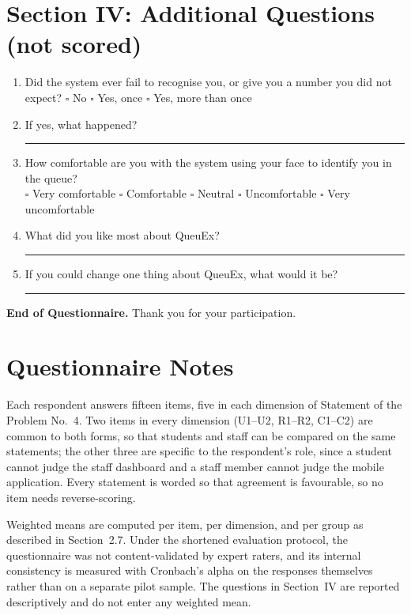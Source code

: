 \documentclass{research}
\newcommand{\sysname}{QueuEx}
\begin{document}
\section*{Section IV: Additional Questions (not scored)}

\begin{enumerate}
  \item Did the system ever fail to recognise you, or give you a number
        you did not expect?
        $\square$ No \quad $\square$ Yes, once \quad
        $\square$ Yes, more than once
  \item If yes, what happened?\\[0.3em]
        \rule{\linewidth}{0.4pt}
  \item How comfortable are you with the system using your face to
        identify you in the queue?\\
        $\square$ Very comfortable \quad $\square$ Comfortable \quad
        $\square$ Neutral \quad $\square$ Uncomfortable \quad
        $\square$ Very uncomfortable
  \item What did you like most about \sysname{}?\\[0.3em]
        \rule{\linewidth}{0.4pt}
  \item If you could change one thing about \sysname{}, what would it
        be?\\[0.3em]
        \rule{\linewidth}{0.4pt}
\end{enumerate}

\begin{center}
\textbf{End of Questionnaire.} Thank you for your participation.
\end{center}

\section*{Questionnaire Notes}

Each respondent answers fifteen items, five in each dimension of
Statement of the Problem No.~4. Two items in every dimension (U1--U2,
R1--R2, C1--C2) are common to both forms, so that students and staff
can be compared on the same statements; the other three are specific to
the respondent's role, since a student cannot judge the staff dashboard
and a staff member cannot judge the mobile application. Every statement
is worded so that agreement is favourable, so no item needs
reverse-scoring.

Weighted means are computed per item, per dimension, and per group as
described in Section~2.7. Under the shortened evaluation protocol, the
questionnaire was not content-validated by expert raters, and its
internal consistency is measured with Cronbach's alpha on the responses
themselves rather than on a separate pilot sample. The questions in Section~IV are reported descriptively and
do not enter any weighted mean.
\end{document}
